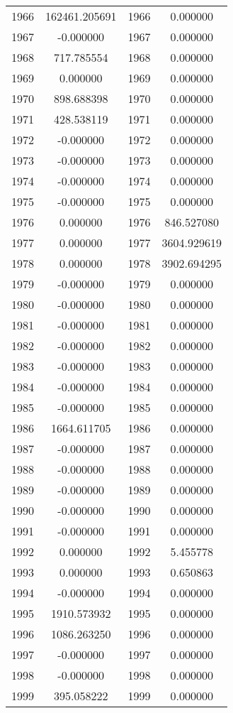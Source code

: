 \documentclass[12pt]{article}
\begin{document}
\begin{longtable}{@{}cccc@{}}
1966 & 162461.205691 & 1966 & 0.000000 \\
1967 & -0.000000 & 1967 & 0.000000 \\
1968 & 717.785554 & 1968 & 0.000000 \\
1969 & 0.000000 & 1969 & 0.000000 \\
1970 & 898.688398 & 1970 & 0.000000 \\
1971 & 428.538119 & 1971 & 0.000000 \\
1972 & -0.000000 & 1972 & 0.000000 \\
1973 & -0.000000 & 1973 & 0.000000 \\
1974 & -0.000000 & 1974 & 0.000000 \\
1975 & -0.000000 & 1975 & 0.000000 \\
1976 & 0.000000 & 1976 & 846.527080 \\
1977 & 0.000000 & 1977 & 3604.929619 \\
1978 & 0.000000 & 1978 & 3902.694295 \\
1979 & -0.000000 & 1979 & 0.000000 \\
1980 & -0.000000 & 1980 & 0.000000 \\
1981 & -0.000000 & 1981 & 0.000000 \\
1982 & -0.000000 & 1982 & 0.000000 \\
1983 & -0.000000 & 1983 & 0.000000 \\
1984 & -0.000000 & 1984 & 0.000000 \\
1985 & -0.000000 & 1985 & 0.000000 \\
1986 & 1664.611705 & 1986 & 0.000000 \\
1987 & -0.000000 & 1987 & 0.000000 \\
1988 & -0.000000 & 1988 & 0.000000 \\
1989 & -0.000000 & 1989 & 0.000000 \\
1990 & -0.000000 & 1990 & 0.000000 \\
1991 & -0.000000 & 1991 & 0.000000 \\
1992 & 0.000000 & 1992 & 5.455778 \\
1993 & 0.000000 & 1993 & 0.650863 \\
1994 & -0.000000 & 1994 & 0.000000 \\
1995 & 1910.573932 & 1995 & 0.000000 \\
1996 & 1086.263250 & 1996 & 0.000000 \\
1997 & -0.000000 & 1997 & 0.000000 \\
1998 & -0.000000 & 1998 & 0.000000 \\
1999 & 395.058222 & 1999 & 0.000000 \\

\end{longtable}
\end{document}
